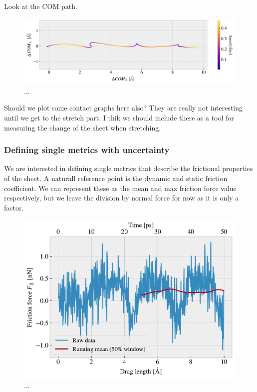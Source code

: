 Look at the COM path.

\begin{figure}[H]
  \centering
  \includegraphics[width=\linewidth]{figures/baseline/COM_path.pdf}
  \caption{...}
  \label{fig:COM_path}
\end{figure}


Should we plot some contact graphs here also? They are really not interesting until we get to the stretch part. I thik we should include there as a tool for measuring the change of the sheet when stretching.

\subsubsection{Defining single metrics with uncertainty}

We are interested in defining single metrics that describe the frictional properties of the sheet. A naturall reference point is the dynamic and static friction coefficient. We can represent these as the mean and max friction force value respectively, but we leave the division by normal force for now as it is only a factor. 


\begin{figure}[H]
  \centering
  \includegraphics[width=0.7\linewidth]{figures/baseline/Ff_running_mean.pdf}
  \caption{...}
  \label{fig:Ff_runmean}
\end{figure}


